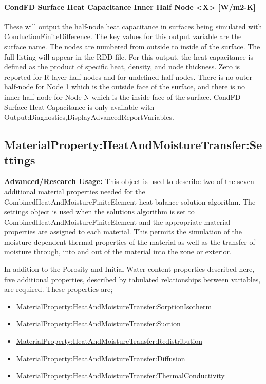 \paragraph{CondFD Surface Heat Capacitance Inner Half Node \textless{}X\textgreater{} {[}W/m2-K{]}}\label{condfd-surface-heat-capacitance-inner-half-node-x-wm2-k}

These will output the half-node heat capacitance in surfaces being simulated with ConductionFiniteDifference. The key values for this output variable are the surface name. The nodes are numbered from outside to inside of the surface. The full listing will appear in the RDD file. For this output, the heat capacitance is defined as the product of specific heat, density, and node thickness. Zero is reported for R-layer half-nodes and for undefined half-nodes. There is no outer half-node for Node 1 which is the outside face of the surface, and there is no inner half-node for Node N which is the inside face of the surface. CondFD Surface Heat Capacitance is only available with Output:Diagnostics,DisplayAdvancedReportVariables.

\subsection{MaterialProperty:HeatAndMoistureTransfer:Settings}\label{materialpropertyheatandmoisturetransfersettings}

\textbf{Advanced/Research Usage:} This object is used to describe two of the seven additional material properties needed for the CombinedHeatAndMoistureFiniteElement heat balance solution algorithm. The settings object is used when the solutions algorithm is set to CombinedHeatAndMoistureFiniteElement and the appropriate material properties are assigned to each material. This permits the simulation of the moisture dependent thermal properties of the material as well as the transfer of moisture through, into and out of the material into the zone or exterior.

In addition to the Porosity and Initial Water content properties described here, five additional properties, described by tabulated relationships between variables, are required. These properties are;

\begin{itemize}
\item
  \hyperref[materialpropertyheatandmoisturetransfersorptionisotherm]{MaterialProperty:HeatAndMoistureTransfer:SorptionIsotherm}
\item
  \hyperref[materialpropertyheatandmoisturetransfersuction]{MaterialProperty:HeatAndMoistureTransfer:Suction}
\item
  \hyperref[materialpropertyheatandmoisturetransferredistribution]{MaterialProperty:HeatAndMoistureTransfer:Redistribution}
\item
  \hyperref[materialpropertyheatandmoisturetransferdiffusion]{MaterialProperty:HeatAndMoistureTransfer:Diffusion}
\item
  \hyperref[materialpropertyheatandmoisturetransferthermalconductivity]{MaterialProperty:HeatAndMoistureTransfer:ThermalConductivity}
\end{itemize}

